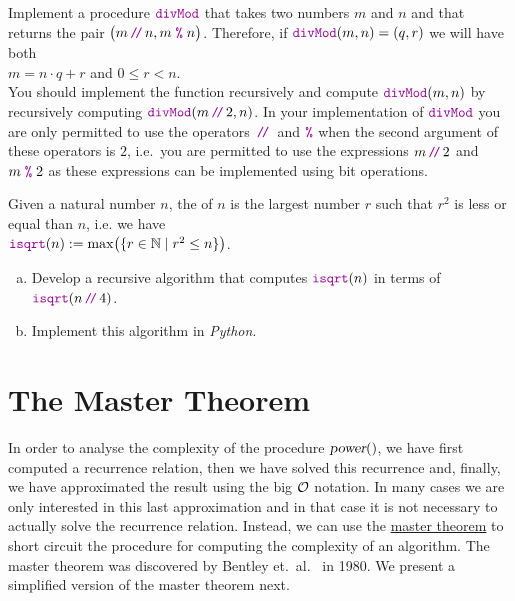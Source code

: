\exercise
Implement a procedure $\mytt{divMod}$ that takes two numbers $m$ and $n$ and that returns the pair
$\bigl(m \dv n, m \;\mytt{\%}\; n\bigr)$.
Therefore, if $\mytt{divMod}(m, n) = (q,r)$ we will have both
\\[0.2cm]
\hspace*{1.3cm}
$m = n \cdot q + r$ \quad and \quad $0 \leq r < n$.
\\[0.2cm]
You should implement the function recursively and compute 
$\mytt{divMod}(m, n)$ by recursively computing $\mytt{divMod}(m \dv 2, n)$.
In your implementation of $\mytt{divMod}$ you are only permitted to use the operators $\dv$ and
$\mytt{\%}$ when the second argument of these operators is $2$, i.e.~you are permitted to
use the expressions $m \dv 2$ and $m \;\mytt{\%}\; 2$ as these expressions can be implemented
using bit operations.
\eoxs


\exercise
Given a natural number $n$, the   of $n$ is the largest
number $r$ such that $r^2$ is less or equal than $n$, i.e. we have
\\[0.2cm]
\hspace*{1.3cm}
$\mytt{isqrt}(n) := \max\bigl(\{ r \in \mathbb{N} \mid r^2 \leq n \}\bigr)$.
\begin{enumerate}[(a)]
\item Develop a recursive algorithm that computes $\mytt{isqrt}(n)$ in terms of $\mytt{isqrt}(n\dv4)$.
\item Implement this algorithm in \textsl{Python}. \eoxs
\end{enumerate}

\section{The Master Theorem}
In order to analyse the complexity of  the procedure $\textsl{power}()$,
we have first computed a  recurrence relation, then we have solved this recurrence and, finally,  
we have approximated the result using the big $\mathcal{O}$ notation.  In many cases we are only interested in this
last approximation and in that case it is not necessary to actually solve the recurrence relation.  
Instead, we can use the 
\href{http://en.wikipedia.org/wiki/Master_theorem#Generic_form}{master theorem} to short 
circuit the procedure for computing the complexity of an algorithm.   The master theorem was discovered by
Bentley et.~al.~\cite{bentley:1980} in 1980.
We present a simplified version of the master theorem next.

